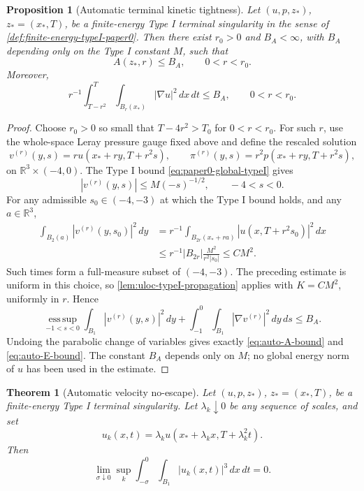 \documentclass[11pt]{amsart}
\theoremstyle{plain}
\newtheorem{theorem}{Theorem}[section]
\newtheorem{proposition}[proposition]{Proposition}
\theoremstyle{definition}
\theoremstyle{remark}
\begin{document}
\begin{proposition}[Automatic terminal kinetic tightness]
\label{prop:auto-terminal-A}
Let \((u,p,z_*)\), \(z_*=(x_*,T)\), be a finite-energy Type I terminal
singularity in the sense of \cref{def:finite-energy-typeI-paper0}.  Then there
exist \(r_0>0\) and \(B_A<\infty\), with \(B_A\) depending only on the Type I
constant \(M\), such that
\begin{equation}\label{eq:auto-A-bound}
  A(z_*,r)\le B_A,
  \qquad 0<r<r_0 .
\end{equation}
Moreover,
\begin{equation}\label{eq:auto-E-bound}
  r^{-1}\int_{T-r^2}^{T}\int_{B_r(x_*)}|\nabla u|^2\,dx\,dt
  \le B_A,
  \qquad 0<r<r_0 .
\end{equation}
\end{proposition}

\begin{proof}
Choose \(r_0>0\) so small that \(T-4r^2>T_0\) for \(0<r<r_0\).  For such
\(r\), use the whole-space Leray pressure gauge fixed above and define the
rescaled solution
\[
  v^{(r)}(y,s)=r u(x_*+ry,T+r^2s),
  \qquad
  \pi^{(r)}(y,s)=r^2 p(x_*+ry,T+r^2s),
\]
on \(\mathbb R^3\times(-4,0)\).  The Type I bound
\eqref{eq:paper0-global-typeI} gives
\[
  |v^{(r)}(y,s)|\le M(-s)^{-1/2},
  \qquad -4<s<0 .
\]
For any admissible \(s_0\in(-4,-3)\) at which the Type I bound holds, and any
\(a\in\mathbb R^3\),
\begin{align*}
  \int_{B_2(a)} |v^{(r)}(y,s_0)|^2\,dy
  &= r^{-1}\int_{B_{2r}(x_*+ra)}
       |u(x,T+r^2s_0)|^2\,dx                                    \\
  &\le r^{-1}|B_{2r}|\frac{M^2}{r^2|s_0|}
   \le C M^2 .
\end{align*}
Such times form a full-measure subset of \((-4,-3)\).  The preceding estimate
is uniform in this choice, so \cref{lem:uloc-typeI-propagation} applies with
\(K=CM^2\), uniformly in \(r\).  Hence
\[
  \operatorname*{ess\,sup}_{-1<s<0}\int_{B_1}|v^{(r)}(y,s)|^2\,dy
  +\int_{-1}^{0}\int_{B_1}|\nabla v^{(r)}|^2\,dy\,ds
  \le B_A .
\]
Undoing the parabolic change of variables gives exactly
\eqref{eq:auto-A-bound} and \eqref{eq:auto-E-bound}.  The constant \(B_A\)
depends only on \(M\); no global energy norm of \(u\) has been used in the
estimate.
\end{proof}

\begin{theorem}[Automatic velocity no-escape]
\label{thm:auto-velocity-no-escape}
Let \((u,p,z_*)\), \(z_*=(x_*,T)\), be a finite-energy Type I terminal
singularity.  Let \(\lambda_k\downarrow0\) be any sequence of scales, and set
\[
  u_k(x,t)=\lambda_k u(x_*+\lambda_k x,T+\lambda_k^2 t).
\]
Then
\begin{equation}\label{eq:auto-no-escape}
  \lim_{\sigma\downarrow0}
  \sup_k\int_{-\sigma}^{0}\int_{B_1}|u_k(x,t)|^3\,dx\,dt=0 .
\end{equation}
\end{theorem}
\end{document}
